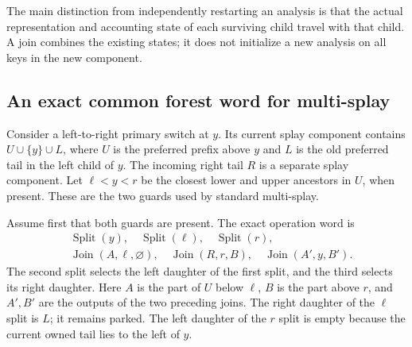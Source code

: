 \documentclass[11pt]{article}
\numberwithin{equation}{section}
\begin{document}
The main distinction from independently restarting an analysis is that
the actual representation and accounting state of each surviving child
travel with that child. A join combines the existing states; it does
not initialize a new analysis on all keys in the new component.

\subsection{An exact common forest word for multi-splay}

Consider a left-to-right primary switch at $y$. Its current splay
component contains $U\cup\{y\}\cup L$, where $U$ is the preferred
prefix above $y$ and $L$ is the old preferred tail in the left child of
$y$. The incoming right tail $R$ is a separate splay component. Let
$\ell<y<r$ be the closest lower and upper ancestors in $U$, when
present. These are the two guards used by standard multi-splay.

Assume first that both guards are present. The exact operation word is
\begin{equation}\label{eq:ms-word}
\begin{aligned}
 &\operatorname{Split}(y),\quad \operatorname{Split}(\ell),\quad
  \operatorname{Split}(r),\\
 &\operatorname{Join}(A,\ell,\varnothing),\quad
  \operatorname{Join}(R,r,B),\quad
  \operatorname{Join}(A',y,B').
\end{aligned}
\end{equation}
The second split selects the left daughter of the first split, and the
third selects its right daughter. Here $A$ is the part of $U$ below
$\ell$, $B$ is the part above $r$, and $A',B'$ are the outputs of the
two preceding joins. The right daughter of the $\ell$ split is $L$;
it remains parked. The left daughter of the $r$ split is empty because
the current owned tail lies to the left of $y$.
\end{document}
